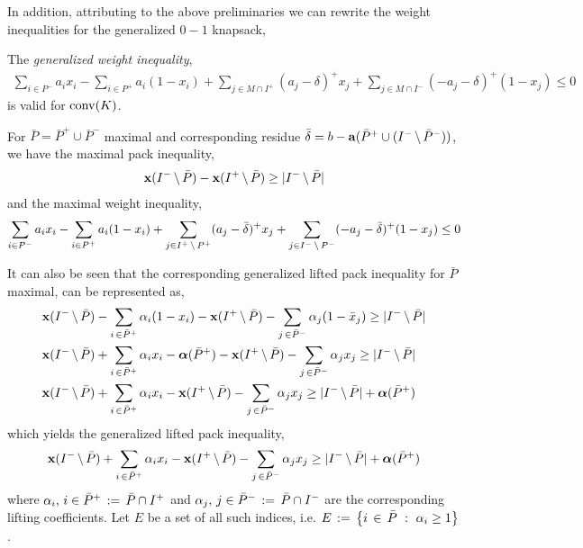 \documentclass[10pt,twoside]{amsart}
\begin{document}
In addition, attributing to the above preliminaries we can rewrite the weight inequalities for the generalized $0-1$ knapsack,
\begin{prop}
\label{prop:genweight}
  The \textit{generalized weight inequality},
  \begin{align}
    \sum_{i\in P^-} a_i x_i - \sum_{i\in P^+} a_i(1-x_i) + \sum_{j \in M\cap I^+} (a_j - \delta)^+ x_j + \sum_{j \in M\cap I^-} (-a_j - \delta)^+ (1-x_j) \leq 0
  \end{align}
  is valid for $\operatorname{conv}(K)$.
\end{prop}
For $\bar{P} = \bar{P}^+ \cup \bar{P}^-$ maximal and corresponding residue $\bar{\delta} = b - \mathbf{a}(\bar{P}^+\cup (I^-\,\backslash\, \bar{P}^-))$, we have the maximal pack inequality,
\begin{align}
  \mathbf{x}(I^-\,\backslash\, \bar{P}) - \mathbf{x}(I^+\,\backslash\, \bar{P}) \geq |I^-\,\backslash\, \bar{P}|
\end{align}
and the maximal weight inequality,
\begin{align}
  \sum_{i\in P^-} a_i x_i - \sum_{i\in P^+} a_i(1-x_i) + \sum_{j \in I^+\,\backslash\, P^+} (a_j - \bar{\delta})^+ x_j + \sum_{j \in I^-\,\backslash\, P^-} (-a_j - \bar{\delta})^+ (1-x_j) \leq 0
\end{align}

It can also be seen that the corresponding generalized lifted pack inequality for $\bar{P}$ maximal, can be represented as,
\begin{align*}
        &\mathbf{x}(I^-\,\backslash\, \bar{P}) - \sum_{i\,\in \bar{P}^+} \alpha_i (1-x_i) - \mathbf{x}(I^+\,\backslash\, \bar{P}) - \sum_{j\,\in \bar{P}^-} \alpha_j (1-\bar{x}_j) \geq |I^-\,\backslash\, \bar{P}|\\
        &\mathbf{x}(I^-\,\backslash\, \bar{P}) + \sum_{i\,\in \bar{P}^+} \alpha_i x_i - \boldsymbol\alpha(\bar{P}^+) - \mathbf{x}(I^+\,\backslash\, \bar{P}) - \sum_{j\,\in \bar{P}^-} \alpha_j {x}_j \geq |I^-\,\backslash\, \bar{P}|\\
        &\mathbf{x}(I^-\,\backslash\, \bar{P}) + \sum_{i\,\in \bar{P}^+} \alpha_i x_i - \mathbf{x}(I^+\,\backslash\, \bar{P}) - \sum_{j\,\in \bar{P}^-} \alpha_j {x}_j \geq |I^-\,\backslash\, \bar{P}| + \boldsymbol\alpha(\bar{P}^+)\\
\end{align*}
which yields the generalized lifted pack inequality,
\begin{align}
\label{ineq:genliftedpack}
    \mathbf{x}(I^-\,\backslash\, \bar{P}) + \sum_{i\,\in \bar{P}^+} \alpha_i x_i - \mathbf{x}(I^+\,\backslash\, \bar{P}) - \sum_{j\,\in \bar{P}^-} \alpha_j {x}_j \geq |I^-\,\backslash\, \bar{P}| + \boldsymbol\alpha(\bar{P}^+)
\end{align}
where $\alpha_i,\,i\in \bar{P}^+ \,:=\, \bar{P}\cap I^+$ and $\alpha_j,\,j\in \bar{P}^- \,:=\, \bar{P}\cap I^-$ are the corresponding lifting coefficients. Let $E$ be a set of all such indices, i.e. $E \,:=\, \left\{ {i\,\in\, \bar{P}} \ : \ {\alpha_i \geq 1} \right\}$.
\end{document}
